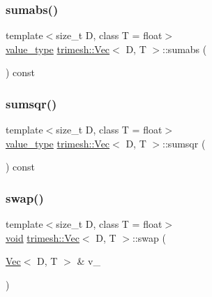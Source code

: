 \subsubsection{\texorpdfstring{sumabs()}{sumabs()}}
{\footnotesize\ttfamily template$<$size\+\_\+t D, class T = float$>$ \\
\hyperlink{classtrimesh_1_1Vec_a10a59253996e42d67c713f37592669df}{value\+\_\+type} \hyperlink{classtrimesh_1_1Vec}{trimesh\+::\+Vec}$<$ D, T $>$\+::sumabs (\begin{DoxyParamCaption}{ }\end{DoxyParamCaption}) const\hspace{0.3cm}{\ttfamily [inline]}}

\mbox{\label{classtrimesh_1_1Vec_a5ea80c490c3c14e11580be1931a77f0b}} 
\subsubsection{\texorpdfstring{sumsqr()}{sumsqr()}}
{\footnotesize\ttfamily template$<$size\+\_\+t D, class T = float$>$ \\
\hyperlink{classtrimesh_1_1Vec_a10a59253996e42d67c713f37592669df}{value\+\_\+type} \hyperlink{classtrimesh_1_1Vec}{trimesh\+::\+Vec}$<$ D, T $>$\+::sumsqr (\begin{DoxyParamCaption}{ }\end{DoxyParamCaption}) const\hspace{0.3cm}{\ttfamily [inline]}}

\mbox{\label{classtrimesh_1_1Vec_aeabbb3531ef4be7bf41dd3c3628f7a54}} 
\subsubsection{\texorpdfstring{swap()}{swap()}}
{\footnotesize\ttfamily template$<$size\+\_\+t D, class T = float$>$ \\
\hyperlink{namespacetrimesh_a784ddfd979e1c579bda795a8edfc3f43}{void} \hyperlink{classtrimesh_1_1Vec}{trimesh\+::\+Vec}$<$ D, T $>$\+::swap (\begin{DoxyParamCaption}\item[{\hyperlink{classtrimesh_1_1Vec}{Vec}$<$ D, T $>$ \&}]{v\+\_\+ }\end{DoxyParamCaption})\hspace{0.3cm}{\ttfamily [inline]}}

